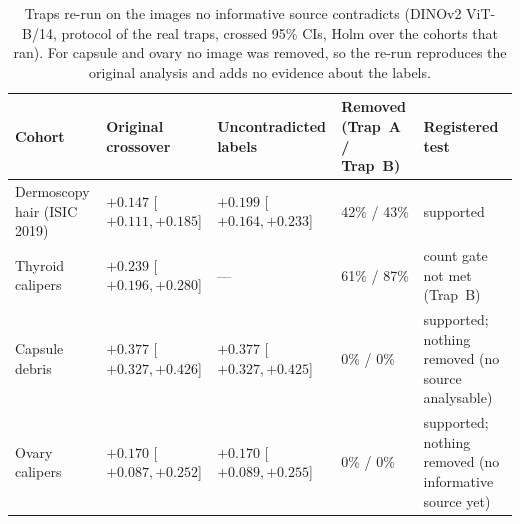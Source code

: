 \begin{table}[H]\centering\scriptsize
\caption{Traps re-run on the images no informative source contradicts (DINOv2 ViT-B/14, protocol of the real traps, crossed 95\% CIs, Holm over the cohorts that ran). For capsule and ovary no image was removed, so the re-run reproduces the original analysis and adds no evidence about the labels.}\label{tab:s16clean}
\begin{tabular}{p{3.2cm}p{2.6cm}p{2.6cm}p{2.4cm}p{4.0cm}}\toprule
Cohort & Original crossover & Uncontradicted labels & Removed (Trap~A / Trap~B) & Registered test \\\midrule
Dermoscopy hair (ISIC 2019) & $+0.147$ [$+0.111, +0.185$] & $+0.199$ [$+0.164, +0.233$] & 42\% / 43\% & supported \\
Thyroid calipers & $+0.239$ [$+0.196, +0.280$] & --- & 61\% / 87\% & count gate not met (Trap~B) \\
Capsule debris & $+0.377$ [$+0.327, +0.426$] & $+0.377$ [$+0.327, +0.425$] & 0\% / 0\% & supported; nothing removed (no source analysable) \\
Ovary calipers & $+0.170$ [$+0.087, +0.252$] & $+0.170$ [$+0.089, +0.255$] & 0\% / 0\% & supported; nothing removed (no informative source yet) \\
\bottomrule\end{tabular}
\end{table}
